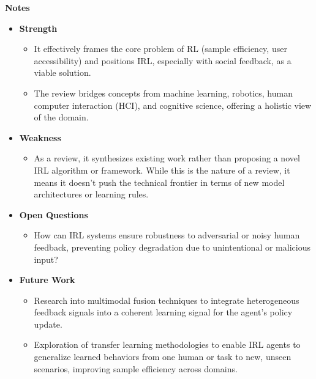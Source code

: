 \documentclass[report.tex]{subfiles}
\begin{document}
\noindent\textbf{Notes}
\begin{itemize}
    \item \noindent\textbf {Strength}
    \begin{itemize}
        \item It effectively frames the core problem of RL (sample efficiency, user accessibility) and positions IRL, especially with social feedback, as a viable solution.
        \item The review bridges concepts from machine learning, robotics, human computer interaction (HCI), and cognitive science, offering a holistic view of the domain.
        
       
    \end{itemize}
    
    \item \noindent\textbf{Weakness}
    \begin{itemize}
        \item As a review, it synthesizes existing work rather than proposing a novel IRL algorithm or framework. While this is the nature of a review, it means it doesn't push the technical frontier in terms of new model architectures or learning rules.
    \end{itemize}
\end{itemize}

\begin{itemize}
    \item \noindent\textbf {Open Questions}
    \begin{itemize}
        \item     How can IRL systems ensure robustness to adversarial or noisy human feedback, preventing policy degradation due to unintentional or malicious input?

    \end{itemize}
    
    \item \noindent\textbf{Future Work}
    \begin{itemize}
        \item Research into multimodal fusion techniques to integrate heterogeneous feedback signals into a coherent learning signal for the agent's policy update.
        \item Exploration of transfer learning methodologies to enable IRL agents to generalize learned behaviors from one human or task to new, unseen scenarios, improving sample efficiency across domains.
        
    \end{itemize}
\end{itemize}
\end{document}
